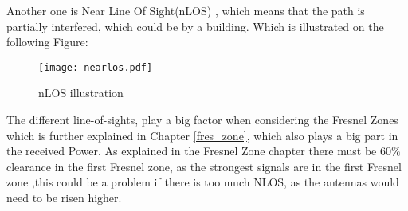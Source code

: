 Another one is Near Line Of Sight(nLOS) \citep{los}, which means that the path is partially interfered,  which could be by a building. Which is illustrated on the following Figure:

\begin{figure}[H]
\centering
\texttt{[image: nearlos.pdf]}
\caption{nLOS illustration}
\label{nLOS}
\end{figure} 


The different line-of-sights, play a big factor when considering the Fresnel Zones which is further explained in Chapter \ref{fres_zone}, which also plays a big part in the received Power. As explained in the Fresnel Zone chapter there must be $60\%$ clearance in the first Fresnel zone, as the strongest signals are in the first Fresnel zone ,this could be a problem if there is too much NLOS, as the antennas would need to be risen higher.       

















